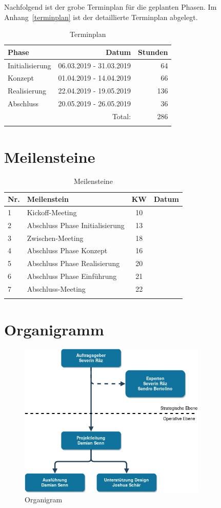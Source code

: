 Nachfolgend ist der grobe Terminplan für die geplanten Phasen. Im Anhang~\ref{terminplan} ist
der detaillierte Terminplan abgelegt.

\begin{longtable}[]{@{}lrr@{}}
  \toprule
  Phase           & Datum                   & Stunden\tabularnewline
  \midrule
  \endhead
  Initialisierung & 06.03.2019 - 31.03.2019 & 64\tabularnewline
  Konzept         & 01.04.2019 - 14.04.2019 & 66\tabularnewline
  Realisierung    & 22.04.2019 - 19.05.2019 & 136\tabularnewline
  Abschluss       & 20.05.2019 - 26.05.2019 & 36\tabularnewline
  \midrule
                  & Total:                  & 286\tabularnewline
  \bottomrule
  \caption{Terminplan}
\end{longtable}


\section{Meilensteine}\label{meilensteine}


\begin{longtable}[]{@{}llcl@{}}
  \toprule
  Nr.           & Meilenstein                   & KW & Datum\tabularnewline
  \midrule
  \endhead
  1 & Kickoff-Meeting & 10 & \tabularnewline
  2 & Abschluss Phase Initialisierung & 13 & \tabularnewline
  3 & Zwischen-Meeting & 18 & \tabularnewline
  4 & Abschluss Phase Konzept & 16 & \tabularnewline
  5 & Abschluss Phase Realisierung & 20 \tabularnewline
  6 & Abschluss Phase Einführung & 21 \tabularnewline
  7 & Abschluss-Meeting & 22 \tabularnewline
  \bottomrule
  \caption{Meilensteine}
\end{longtable}

\clearpage

\section{Organigramm}\label{organigramm}

\begin{figure}[!htb]
  \centering
  \includegraphics[width=0.8\textwidth]{figures/organigram.png}
  \caption{Organigram}
\end{figure}

